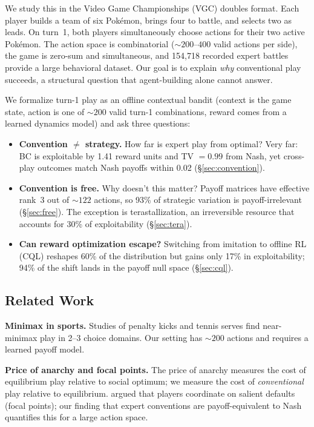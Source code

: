 \documentclass{article}
\begin{document}
We study this in the Video Game Championships (VGC) doubles format. Each player builds a team of six Pok\'emon, brings four to battle, and selects two as leads. On turn~1, both players simultaneously choose actions for their two active Pok\'emon. The action space is combinatorial (${\sim}200$--$400$ valid actions per side), the game is zero-sum and simultaneous, and 154,718 recorded expert battles provide a large behavioral dataset. Our goal is to explain \emph{why} conventional play succeeds, a structural question that agent-building alone cannot answer.

We formalize turn-1 play as an offline contextual bandit (context is the
game state, action is one of ${\sim}200$ valid turn-1 combinations, reward
comes from a learned dynamics model) and ask three questions:

\begin{itemize}[nosep,leftmargin=*]
  \item \textbf{Convention $\neq$ strategy.} How far is expert play from
    optimal? Very far: BC is exploitable by 1.41 reward units and
    TV $= 0.99$ from Nash, yet cross-play outcomes match Nash payoffs
    within 0.02 (\S\ref{sec:convention}).
  \item \textbf{Convention is free.} Why doesn't this matter? Payoff
    matrices have effective rank~3 out of ${\sim}122$ actions, so 93\%
    of strategic variation is payoff-irrelevant (\S\ref{sec:free}). The
    exception is terastallization, an irreversible resource that accounts
    for 30\% of exploitability (\S\ref{sec:tera}).
  \item \textbf{Can reward optimization escape?} Switching from imitation
    to offline RL (CQL) reshapes 60\% of the distribution but gains only
    17\% in exploitability; 94\% of the shift lands in the payoff null
    space (\S\ref{sec:cql}).
\end{itemize}

\subsection{Related Work}

\textbf{Minimax in sports.}
Studies of penalty kicks \citep{chiappori2002testing, palacios2003professionals} and tennis serves \citep{walker2001minimax, anderson2024professionals} find near-minimax play in 2--3 choice domains. Our setting has ${\sim}200$ actions and requires a learned payoff model.

\textbf{Price of anarchy and focal points.}
The price of anarchy \citep{koutsoupias1999worst, roughgarden2002bad} measures the cost of equilibrium play relative to social optimum; we measure the cost of \emph{conventional} play relative to equilibrium. \citet{schelling1960strategy} argued that players coordinate on salient defaults (focal points); our finding that expert conventions are payoff-equivalent to Nash quantifies this for a large action space.
\end{document}
